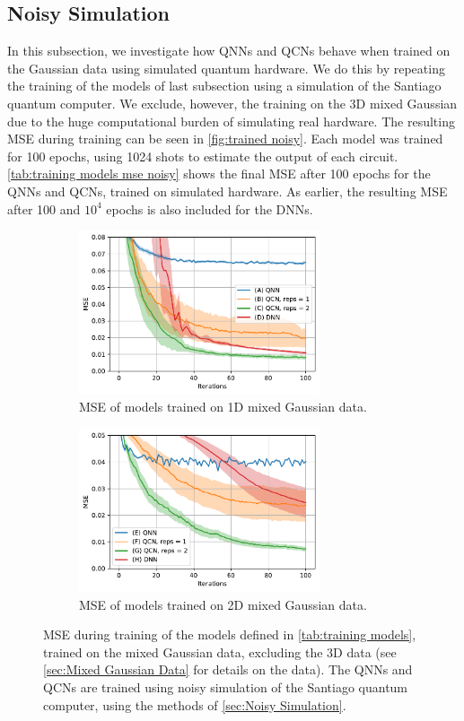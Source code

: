 \subsection{Noisy Simulation}\label{sec:Noisy Simulation}
In this subsection, we investigate how QNNs and QCNs behave when trained on the Gaussian data using simulated quantum hardware. We do this by repeating the training of the models of last subsection using a simulation of the Santiago quantum computer. We exclude, however, the training on the 3D mixed Gaussian due to the huge computational burden of simulating real hardware. The resulting MSE during training can be seen in \autoref{fig:trained noisy}. Each model was trained for 100 epochs, using 1024 shots to estimate the output of each circuit. \autoref{tab:training models mse noisy} shows the final MSE after 100 epochs for the QNNs and QCNs, trained on simulated hardware. As earlier, the resulting MSE after 100 and $10^{4}$ epochs is also included for the DNNs.


\begin{figure}[H]
    \centering
    \begin{subfigure}[t]{0.45\textwidth}
        \centering
        \includegraphics[height=1.9in]{latex/figures/1D_gaussian_data_fit_noisy.pdf}
        \caption{MSE of models trained on 1D mixed Gaussian data.}
        
    \end{subfigure}%
    \hfill 
    \begin{subfigure}[t]{0.45\textwidth}
        \centering
        \includegraphics[height=1.9in]{latex/figures/2D_gaussian_data_fit_noisy.pdf}
        \caption{MSE of models trained on 2D mixed Gaussian data.}
    \end{subfigure}
    \caption{MSE during training of the models defined in \autoref{tab:training models}, trained on the mixed Gaussian data, excluding the 3D data (see \autoref{sec:Mixed Gaussian Data} for details on the data). The QNNs and QCNs are trained using noisy simulation of the Santiago quantum computer, using the methods of \autoref{sec:Noisy Simulation}.}
    \label{fig:trained noisy}
\end{figure}


